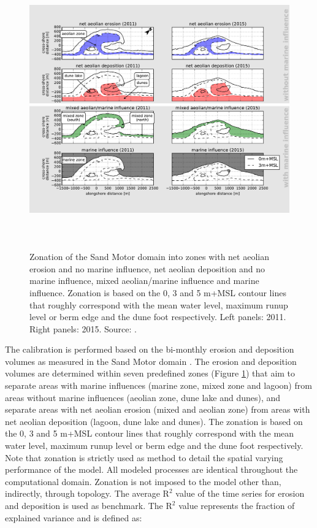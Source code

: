 \documentclass[preprint,12pt,authoryear]{elsarticle}
\begin{document}
\begin{figure}
  \centering
  \includegraphics[height=12cm, angle=90]{decomposition}
  \caption{Zonation of the Sand Motor domain into zones with net
    aeolian erosion and no marine influence, net aeolian deposition
    and no marine influence, mixed aeolian/marine influence and marine
    influence. Zonation is based on the 0, 3 and 5 m+MSL contour lines
    that roughly correspond with the mean water level, maximum runup
    level or berm edge and the dune foot respectively. Left panels:
    2011. Right panels: 2015. Source: \citet{Hoonhout2017a}.}
  \label{fig:decomposition2}
\end{figure}

The calibration is performed based on the bi-monthly erosion and
deposition volumes as measured in the Sand Motor domain
\citep{Hoonhout2017a}. The erosion and deposition volumes are
determined within seven predefined zones (Figure
\ref{fig:decomposition2}) that aim to separate areas with marine
influences (marine zone, mixed zone and lagoon) from areas without
marine influences (aeolian zone, dune lake and dunes), and separate
areas with net aeolian erosion (mixed and aeolian zone) from areas
with net aeolian deposition (lagoon, dune lake and dunes). The
zonation is based on the 0, 3 and 5 m+MSL contour lines that roughly
correspond with the mean water level, maximum runup level or berm edge
and the dune foot respectively. Note that zonation is strictly used as
method to detail the spatial varying performance of the model. All
modeled processes are identical throughout the computational
domain. Zonation is not imposed to the model other than, indirectly,
through topology. The average $\mathrm{R^2}$ value of the time series
for erosion and deposition is used as benchmark. The $\mathrm{R^2}$
value represents the fraction of explained variance and is defined as:
\end{document}
